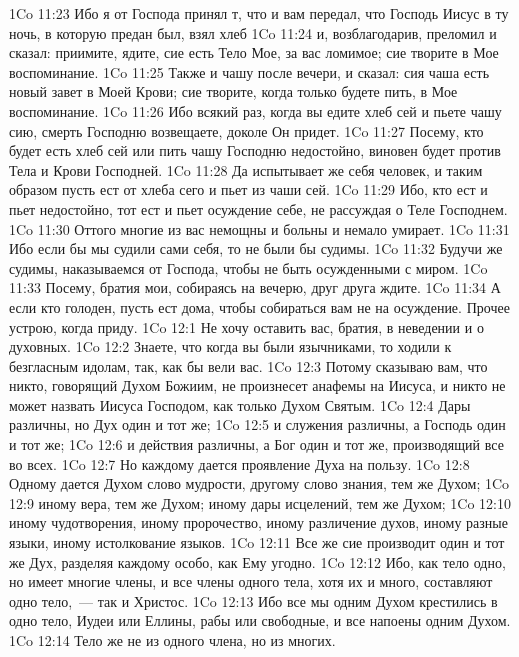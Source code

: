 \vs 1Co 11:23 Ибо я от  Господа принял т, что и вам передал, что Господь Иисус в ту ночь, в которую предан был, взял хлеб
\vs 1Co 11:24 и, возблагодарив, преломил и сказал: приимите, ядите, сие есть Тело Мое, за вас ломимое; сие творите в Мое воспоминание.
\vs 1Co 11:25 Также и чашу после вечери, и сказал: сия чаша есть новый завет в Моей Крови; сие творите, когда только будете пить, в Мое воспоминание.
\vs 1Co 11:26 Ибо всякий раз, когда вы едите хлеб сей и пьете чашу сию, смерть Господню возвещаете, доколе Он придет.
\vs 1Co 11:27 Посему, кто будет есть хлеб сей или пить чашу Господню недостойно, виновен будет против Тела и Крови Господней.
\vs 1Co 11:28 Да испытывает же себя человек, и таким образом пусть ест от хлеба сего и пьет из чаши сей.
\vs 1Co 11:29 Ибо, кто ест и пьет недостойно, тот ест и пьет осуждение себе, не рассуждая о Теле Господнем.
\vs 1Co 11:30 Оттого многие из вас немощны и больны и немало умирает.
\vs 1Co 11:31 Ибо если бы мы судили сами себя, то не были бы судимы.
\vs 1Co 11:32 Будучи же судимы, наказываемся от Господа, чтобы не быть осужденными с миром.
\vs 1Co 11:33 Посему, братия мои, собираясь на вечерю, друг друга ждите.
\vs 1Co 11:34 А если кто голоден, пусть ест дома, чтобы собираться вам не на осуждение. Прочее устрою, когда приду.
\vs 1Co 12:1 Не хочу оставить вас, братия, в неведении и о  духовных.
\vs 1Co 12:2 Знаете, что когда вы были язычниками, то ходили к безгласным идолам, так, как бы вели вас.
\vs 1Co 12:3 Потому сказываю вам, что никто, говорящий Духом Божиим, не произнесет анафемы на Иисуса, и никто не может назвать Иисуса Господом, как только Духом Святым.
\vs 1Co 12:4 Дары различны, но Дух один и тот же;
\vs 1Co 12:5 и служения различны, а Господь один и тот же;
\vs 1Co 12:6 и действия различны, а Бог один и тот же, производящий все во всех.
\vs 1Co 12:7 Но каждому дается проявление Духа на пользу.
\vs 1Co 12:8 Одному дается Духом слово мудрости, другому слово знания, тем же Духом;
\vs 1Co 12:9 иному вера, тем же Духом; иному дары исцелений, тем же Духом;
\vs 1Co 12:10 иному чудотворения, иному пророчество, иному различение духов, иному разные языки, иному истолкование языков.
\vs 1Co 12:11 Все же сие производит один и тот же Дух, разделяя каждому особо, как Ему угодно.
\vs 1Co 12:12 Ибо, как тело одно, но имеет многие члены, и все члены одного тела, хотя их и много, составляют одно тело,~--- так и Христос.
\vs 1Co 12:13 Ибо все мы одним Духом крестились в одно тело, Иудеи или Еллины, рабы или свободные, и все напоены одним Духом.
\vs 1Co 12:14 Тело же не из одного члена, но из многих.
